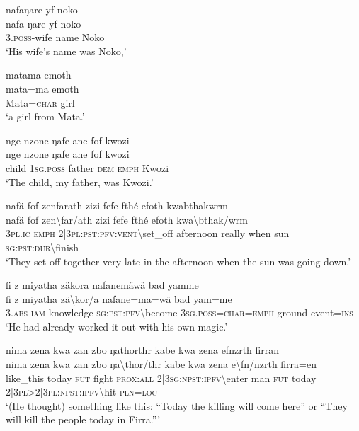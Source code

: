 \ea\label{ex:4:a1677}
nafaŋare yf noko\\
\gll nafa-ŋare	yf	noko\\
     3.\textsc{poss}-wife	name	Noko\\
\glt `His wife's name was Noko,'
\z

\ea\label{ex:4:a1678}
matama emoth\\
\gll mata=ma	emoth\\
     Mata=\textsc{char}	girl\\
\glt `a girl from Mata.'
\z

\ea\label{ex:4:a1679}
nge nzone ŋafe ane fof kwozi\\
\gll nge	nzone	ŋafe	ane	fof	kwozi\\
     child	1\textsc{sg}.\textsc{poss}	father	\textsc{dem}	\textsc{emph}	Kwozi\\
\glt `The child, my father, was Kwozi.'
\z

\ea\label{ex:4:a1680}
nafä fof zenfarath zizi fefe fthé efoth kwabthakwrm\\
\gll nafä	fof	zen{\textbackslash}far/ath	zizi	fefe	fthé	efoth	kwa{\textbackslash}bthak/wrm\\
     3\textsc{pl}.\textsc{ic}	\textsc{emph}	2|3\textsc{pl}:\textsc{pst}:\textsc{pfv}:\textsc{vent}{\textbackslash}set\_off	afternoon	really	when	sun	\textsc{sg}:\textsc{pst}:\textsc{dur}{\textbackslash}finish\\
\glt `They set off together very late in the afternoon when the sun was going down.'
\z

\ea\label{ex:4:a1681}
fi z miyatha zäkora nafanemäwä bad yamme\\
\gll fi	z	miyatha	zä{\textbackslash}kor/a	nafane=ma=wä	bad	yam=me\\
     3.\textsc{abs}	\textsc{iam}	knowledge	\textsc{sg}:\textsc{pst}:\textsc{pfv}{\textbackslash}become	3\textsc{sg}.\textsc{poss}=\textsc{char}=\textsc{emph}	ground	event=\textsc{ins}\\
\glt `He had already worked it out with his own magic.'
\z

\ea\label{ex:4:a1682}
nima zena kwa zan zbo ŋathorthr kabe kwa zena efnzrth firran\\
\gll nima	zena	kwa	zan	zbo	ŋa{\textbackslash}thor/thr	kabe	kwa	zena	e{\textbackslash}fn/nzrth	firra=en\\
     like\_this	today	\textsc{fut}	fight	\textsc{prox}:\textsc{all}	2|3\textsc{sg}:\textsc{npst}:\textsc{ipfv}{\textbackslash}enter	man	\textsc{fut}	today	2|3\textsc{pl}>2|3\textsc{pl}:\textsc{npst}:\textsc{ipfv}{\textbackslash}hit	\textsc{pln}=\textsc{loc}\\
\glt `(He thought) something like this: ``Today the killing will come here'' or ``They will kill the people today in Firra.'''
\z

